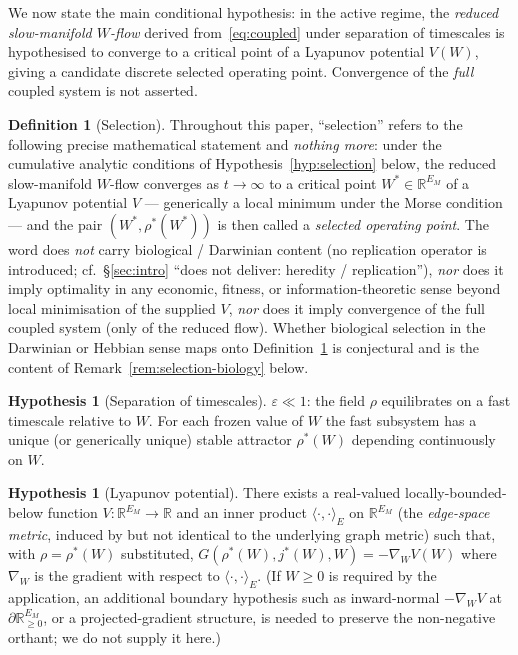 \documentclass[11pt]{article}
\theoremstyle{definition}
\newtheorem{definition}[theorem]{Definition}
\newtheorem{hypothesis}[theorem]{Hypothesis}
\newcommand{\R}{\mathbb{R}}
\begin{document}
We now state the main conditional hypothesis: in the active regime, the \emph{reduced slow-manifold $W$-flow} derived from~\eqref{eq:coupled} under separation of timescales is hypothesised to converge to a critical point of a Lyapunov potential $V(W)$, giving a candidate discrete selected operating point. Convergence of the \emph{full} coupled system is not asserted.

\begin{definition}[Selection]\label{def:selection}
Throughout this paper, ``selection'' refers to the following precise mathematical statement and \emph{nothing more}: under the cumulative analytic conditions of Hypothesis~\ref{hyp:selection} below, the reduced slow-manifold $W$-flow converges as $t \to \infty$ to a critical point $W^* \in \R^{E_M}$ of a Lyapunov potential $V$ --- generically a local minimum under the Morse condition --- and the pair $(W^*, \rho^*(W^*))$ is then called a \emph{selected operating point}. The word does \emph{not} carry biological / Darwinian content (no replication operator is introduced; cf.\ \S\ref{sec:intro} ``does not deliver: heredity / replication''), \emph{nor} does it imply optimality in any economic, fitness, or information-theoretic sense beyond local minimisation of the supplied $V$, \emph{nor} does it imply convergence of the full coupled system (only of the reduced flow). Whether biological selection in the Darwinian or Hebbian sense maps onto Definition~\ref{def:selection} is conjectural and is the content of Remark~\ref{rem:selection-biology} below.
\end{definition}

\begin{hypothesis}[Separation of timescales]\label{hyp:timescales}
$\varepsilon \ll 1$: the field $\rho$ equilibrates on a fast timescale relative to $W$. For each frozen value of $W$ the fast subsystem has a unique (or generically unique) stable attractor $\rho^*(W)$ depending continuously on $W$.
\end{hypothesis}

\begin{hypothesis}[Lyapunov potential]\label{hyp:lyapunov}
There exists a real-valued locally-bounded-below function $V: \R^{E_M} \to \R$ and an inner product $\langle\cdot,\cdot\rangle_E$ on $\R^{E_M}$ (the \emph{edge-space metric}, induced by but not identical to the underlying graph metric) such that, with $\rho = \rho^*(W)$ substituted, $G(\rho^*(W), j^*(W), W) = -\nabla_W V(W)$ where $\nabla_W$ is the gradient with respect to $\langle\cdot,\cdot\rangle_E$. (If $W \geq 0$ is required by the application, an additional boundary hypothesis such as inward-normal $-\nabla_W V$ at $\partial \R^{E_M}_{\geq 0}$, or a projected-gradient structure, is needed to preserve the non-negative orthant; we do not supply it here.)
\end{hypothesis}
\end{document}
